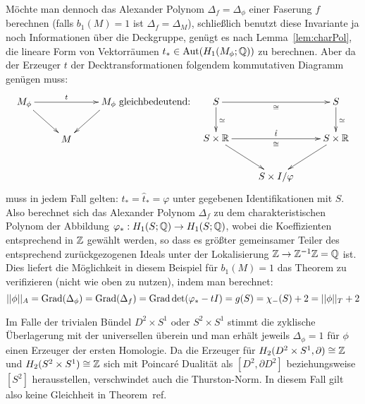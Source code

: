 \begin{bsp}
    	Möchte man dennoch das Alexander Polynom $\Delta_f=\Delta_\phi$ einer Faserung $f$ berechnen (falls $b_1(M)=1$ ist $\Delta_f=\Delta_M$), schließlich benutzt diese Invariante ja noch Informationen über die Deckgruppe, genügt es nach Lemma~\ref{lem:charPol}, die lineare Form von Vektorräumen $t_* \in \operatorname{Aut}(H_1(M_\phi;\mathbb{Q}))$ zu berechnen. Aber da der Erzeuger $t$ der Decktransformationen folgendem kommutativen Diagramm genügen muss:
    	\begin{eqnarray*}
    		\begin{xy}
    			\xymatrix{
    				M_\phi \ar[rr]^t \ar[dr] && M_\phi \ar[dl]\\
    				&M&}
    		\end{xy} 
    		&
    		\text{gleichbedeutend:}
    		&
    		    	\begin{xy}
    			\xymatrix{
    				S \ar[d]^{\simeq} \ar[rr]_\cong && S \ar[d]^{\simeq} \\
    				S \times \RR \ar[rr]^{\hat t}_\cong \ar[dr] && S\times \RR \ar[dl]\\
    				&S\times I / \varphi&}
    		\end{xy}
    	\end{eqnarray*}
    	muss in jedem Fall gelten: $t_* = \hat t_* = \varphi$ unter gegebenen Identifikationen mit $S$. Also berechnet sich das Alexander Polynom $\Delta_f$ zu dem charakteristischen Polynom der Abbildung $\varphi_*:H_1(S;\mathbb{Q})\to H_1(S;\mathbb{Q})$, wobei die Koeffizienten entsprechend in $\mathbb{Z}$ gewählt werden, so dass es größter gemeinsamer Teiler des entsprechend zurückgezogenen Ideals unter der Lokalisierung $\mathbb{Z} \to \mathbb{Z}^{-1}\mathbb{Z}=\mathbb{Q}$ ist.\\
        Dies liefert die Möglichkeit in diesem Beispiel für $b_1(M)=1$ das Theorem zu verifizieren (nicht wie oben zu nutzen), indem man berechnet: 
        \[
            ||\phi||_A=\operatorname{Grad}(\Delta_\phi)=\operatorname{Grad} (\Delta_f) = \operatorname{Grad} \det (\varphi_*-tI) = g(S) = \chi_-(S) +2 = ||\phi||_T+2
        \]

        Im Falle der trivialen Bündel $D^2\times S^1$ oder $S^2\times S^1$ stimmt die zyklische Überlagerung mit der universellen überein und man erhält jeweils $\Delta_\phi =1$ für $\phi$ einen Erzeuger der ersten Homologie. Da die Erzeuger für $H_2(D^2 \times S^1, \partial)\cong \mathbb{Z}$ und $H_2(S^2\times S^1) \cong \mathbb{Z}$ sich mit Poincaré Dualität als $[D^2,\partial D^2]$ beziehungsweise $[S^2]$ herausstellen, verschwindet auch die Thurston-Norm. In diesem Fall gilt also keine Gleichheit in Theorem~ref. 

    \end{bsp}



